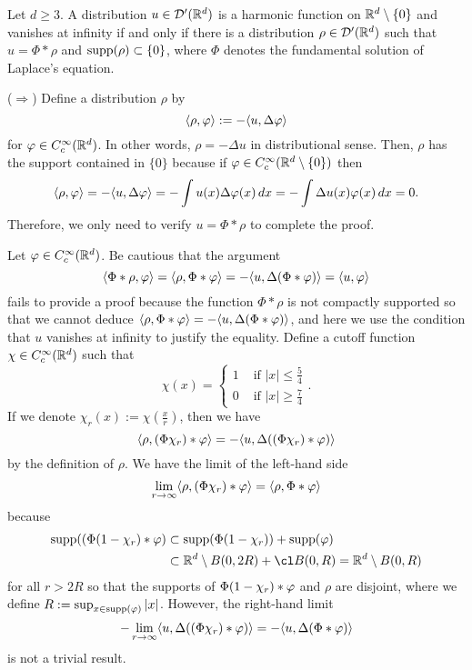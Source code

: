 \documentclass[a4paper]{article}
\begin{document}
\begin{thm*}
Let $d\ge3$.
A distribution $u\in\mathcal{D}'(\mathbb{R}^d)$ is a harmonic function on $\mathbb{R}^d\setminus\{0\}$ and vanishes at infinity if and only if there is a distribution $\rho\in\mathcal{D}'(\mathbb{R}^d)$ such that $u=\Phi*\rho$ and $\operatorname{supp}(\rho)\subset\{0\}$, where $\Phi$ denotes the fundamental solution of Laplace's equation.
\end{thm*}
\begin{pf}
($\Rightarrow$)
Define a distribution $\rho$ by
\[\langle\rho,\varphi\rangle:=-\langle u,\Delta\varphi\rangle\]
for $\varphi\in C_c^\infty(\mathbb{R}^d)$.
In other words, $\rho=-\Delta u$ in distributional sense.
Then, $\rho$ has the support contained in $\{0\}$ because if $\varphi\in C_c^\infty(\mathbb{R}^d\setminus\{0\})$ then
\[\langle\rho,\varphi\rangle=-\langle u,\Delta \varphi\rangle=-\int u(x)\Delta\varphi(x)\,dx=-\int\Delta u(x)\varphi(x)\,dx=0.\]
Therefore, we only need to verify $u=\Phi*\rho$ to complete the proof.

Let $\varphi\in C_c^\infty(\mathbb{R}^d)$.
Be cautious that the argument
\[\langle\Phi*\rho,\varphi\rangle=\langle\rho,\Phi*\varphi\rangle=-\langle u,\Delta(\Phi*\varphi)\rangle=\langle u,\varphi\rangle\]
fails to provide a proof because the function $\Phi*\rho$ is not compactly supported so that we cannot deduce $\langle\rho,\Phi*\varphi\rangle=-\langle u,\Delta(\Phi*\varphi)\rangle$, and here we use the condition that $u$ vanishes at infinity to justify the equality.
Define a cutoff function $\chi\in C_c^\infty(\mathbb{R}^d)$ such that
\[\chi(x)=\begin{cases}1&\text{ if }|x|\le\frac54\\0&\text{ if }|x|\ge\frac74\end{cases}.\]
If we denote $\chi_r(x):=\chi(\frac xr)$, then we have
\[\langle\rho,(\Phi\chi_r)*\varphi\rangle=-\langle u,\Delta((\Phi\chi_r)*\varphi)\rangle\]
by the definition of $\rho$.
We have the limit of the left-hand side
\[\lim_{r\to\infty}\langle\rho,(\Phi\chi_r)*\varphi\rangle=\langle\rho,\Phi*\varphi\rangle\]
because
\begin{align*}
\supp((\Phi(1-\chi_r)*\f)&\subset\supp(\Phi(1-\chi_r))+\supp(\f)\\
&\subset\R^d\setminus B(0,2R)+\cl B(0,R)=\R^d\setminus B(0,R)
\end{align*}
for all $r>2R$ so that the supports of $\Phi(1-\chi_r)*\varphi$ and $\rho$ are disjoint, where we define $R:=\sup_{x\in\operatorname{supp}(\varphi)}|x|$.
However, the right-hand limit
\[-\lim_{r\to\infty}\langle u,\Delta((\Phi\chi_r)*\varphi)\rangle=-\langle u,\Delta(\Phi*\varphi)\rangle\]
is not a trivial result.


\end{pf}
\end{document}
